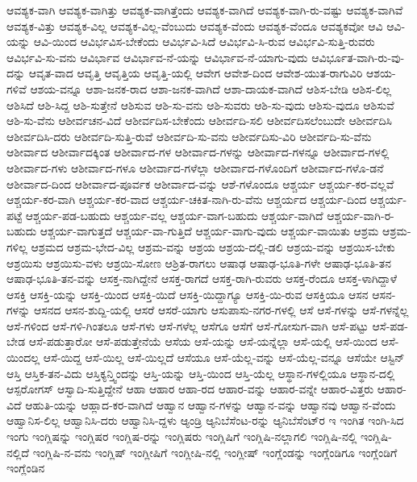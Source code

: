 {ಆವಶ್ಯಕ-ವಾಗಿ
ಆವಶ್ಯಕ-ವಾಗಿತ್ತು
ಆವಶ್ಯಕ-ವಾಗಿತ್ತೆಂದು
ಆವಶ್ಯಕ-ವಾಗಿದೆ
ಆವಶ್ಯಕ-ವಾಗಿ-ರು-ವಷ್ಟು
ಆವಶ್ಯಕ-ವಾಗಿವೆ
ಆವಶ್ಯಕ-ವಿತ್ತು
ಆವಶ್ಯಕ-ವಿಲ್ಲ
ಆವಶ್ಯಕ-ವಿಲ್ಲ-ವೆಂಬುದು
ಆವಶ್ಯಕ-ವೆಂದು
ಆವಶ್ಯಕ-ವೆಂದೂ
ಆವಶ್ಯಕವೋ
ಆವಿ
ಆವಿ-ಯನ್ನು
ಆವಿ-ಯಿಂದ
ಆವಿರ್ಭವಿಸ-ಬೇಕೆಂದು
ಆವಿರ್ಭವಿ-ಸಿದೆ
ಆವಿರ್ಭವಿ-ಸಿ-ರುವ
ಆವಿರ್ಭವಿ-ಸುತ್ತಿ-ರುವರು
ಆವಿರ್ಭವಿ-ಸು-ವನು
ಆವಿರ್ಭಾವ
ಆವಿರ್ಭಾವ-ನೆ-ಯನ್ನು
ಆವಿರ್ಭಾವ-ನೆ-ಯಾಗು-ವುದು
ಆವಿರ್ಭೂತ-ವಾಗಿ-ರು-ವು-ದನ್ನು
ಆವೃತ-ವಾದ
ಆವೃತ್ತಿ
ಆವೃತ್ತಿಯ
ಆವೃತ್ತಿ-ಯಲ್ಲಿ
ಆವೇಗ
ಆವೇಶ-ದಿಂದ
ಆವೇಶ-ಯುತ-ರಾಗುವಿರಿ
ಆಶಯ-ಗಳಿವೆ
ಆಶಯ-ವನ್ನೂ
ಆಶಾ-ಜನಕ-ರಾದ
ಆಶಾ-ಜನಕ-ವಾಗಿದೆ
ಆಶಾ-ದಾಯಕ-ವಾಗಿದೆ
ಆಶಿಸ-ಬೇಡಿ
ಆಶಿಸ-ಲಿಲ್ಲ
ಆಶಿಸಿದೆ
ಆಶಿ-ಸಿದ್ದ
ಆಶಿ-ಸುತ್ತೇನೆ
ಆಶಿಸುವ
ಆಶಿ-ಸು-ವನು
ಆಶಿ-ಸುವರು
ಆಶಿ-ಸು-ವುದು
ಆಶಿಸು-ವುದೂ
ಆಶಿಸುವೆ
ಆಶಿ-ಸು-ವೆನು
ಆಶೀರ್ವಚನ-ವಿದೆ
ಆಶೀರ್ವದಿಸ-ಬೇಕೆಂದು
ಆಶೀರ್ವದಿ-ಸಲಿ
ಆಶೀರ್ವದಿಸಲೆಂಬುದೇ
ಆಶೀರ್ವದಿಸಿ
ಆಶೀರ್ವದಿಸಿ-ದರು
ಆಶೀರ್ವದಿ-ಸುತ್ತಿ-ರುವೆ
ಆಶೀರ್ವದಿ-ಸು-ವನು
ಆಶೀರ್ವದಿಸು-ವಿರಿ
ಆಶೀರ್ವದಿ-ಸು-ವೆನು
ಆಶೀರ್ವಾದ
ಆಶೀರ್ವಾದಕ್ಕಿಂತ
ಆಶೀರ್ವಾದ-ಗಳ
ಆಶೀರ್ವಾದ-ಗಳನ್ನು
ಆಶೀರ್ವಾದ-ಗಳನ್ನೂ
ಆಶೀರ್ವಾದ-ಗಳಲ್ಲಿ
ಆಶೀರ್ವಾದ-ಗಳು
ಆಶೀರ್ವಾದ-ಗಳೂ
ಆಶೀರ್ವಾದ-ಗಳೆಲ್ಲಾ
ಆಶೀರ್ವಾದ-ಗಳೊಂದಿಗೆ
ಆಶೀರ್ವಾದ-ಗಳೊ-ಡನೆ
ಆಶೀರ್ವಾದ-ದಿಂದ
ಆಶೀರ್ವಾದ-ಪೂರ್ವಕ
ಆಶೀರ್ವಾದ-ವನ್ನು
ಆಶೆ-ಗಳೊಂದೂ
ಆಶ್ಚರ್ಯ
ಆಶ್ಚರ್ಯ-ಕರ-ವಲ್ಲವೆ
ಆಶ್ಚರ್ಯ-ಕರ-ವಾಗಿ
ಆಶ್ಚರ್ಯ-ಕರ-ವಾದ
ಆಶ್ಚರ್ಯ-ಚಕಿತ-ನಾಗಿ-ರು-ವೆನು
ಆಶ್ಚರ್ಯದ
ಆಶ್ಚರ್ಯ-ದಿಂದ
ಆಶ್ಚರ್ಯ-ಪಟ್ಟೆ
ಆಶ್ಚರ್ಯ-ಪಡ-ಬಹುದು
ಆಶ್ಚರ್ಯ-ವಲ್ಲ
ಆಶ್ಚರ್ಯ-ವಾಗ-ಬಹುದು
ಆಶ್ಚರ್ಯ-ವಾಗಿದೆ
ಆಶ್ಚರ್ಯ-ವಾಗಿ-ರ-ಬಹುದು
ಆಶ್ಚರ್ಯ-ವಾಗುತ್ತದೆ
ಆಶ್ಚರ್ಯ-ವಾ-ಗುತ್ತಿದೆ
ಆಶ್ಚರ್ಯ-ವಾಗು-ವುದು
ಆಶ್ಚರ್ಯ-ವಾಯಿತು
ಆಶ್ರಮ
ಆಶ್ರಮ-ಗಳಿಲ್ಲ
ಆಶ್ರಮದ
ಆಶ್ರಮ-ಭೇದ-ವಿಲ್ಲ
ಆಶ್ರಮ-ವನ್ನು
ಆಶ್ರಯ
ಆಶ್ರಯ-ದಲ್ಲಿ-ಡಲಿ
ಆಶ್ರಯ-ವನ್ನು
ಆಶ್ರಯಿಸ-ಬೇಕು
ಆಶ್ರಯಿಸು
ಆಶ್ರಯಿಸು-ವಳು
ಆಶ್ರಯಿ-ಸೋಣ
ಆಶ್ರಿತ-ರಾಗಲು
ಆಷಾಢ
ಆಷಾಢ-ಭೂತಿ-ಗಳೇ
ಆಷಾಢ-ಭೂತಿ-ತನ
ಆಷಾಢ-ಭೂತಿ-ತನ-ವನ್ನು
ಆಸಕ್ತ-ನಾಗಿದ್ದೇನೆ
ಆಸಕ್ತ-ರಾಗದೆ
ಆಸಕ್ತ-ರಾಗಿ-ರುವರು
ಆಸಕ್ತ-ರೆಂದೂ
ಆಸಕ್ತ-ಳಾಗಿದ್ದಾಳೆ
ಆಸಕ್ತಿ
ಆಸಕ್ತಿ-ಯನ್ನು
ಆಸಕ್ತಿ-ಯಿಂದ
ಆಸಕ್ತಿ-ಯಿದೆ
ಆಸಕ್ತಿ-ಯಿದ್ದಾಗ್ಯೂ
ಆಸಕ್ತಿ-ಯಿ-ರುವ
ಆಸಕ್ತಿಯೂ
ಆಸನ
ಆಸನ-ಗಳನ್ನು
ಆಸನದ
ಆಸನ-ಶುದ್ದಿ-ಯಲ್ಲಿ
ಆಸರೆ
ಆಸರೆ-ಯಾಗು
ಆಸುಪಾಸು-ನಗರ-ಗಳಲ್ಲಿ
ಆಸೆ
ಆಸೆ-ಗಳನ್ನು
ಆಸೆ-ಗಳನ್ನೆಲ್ಲ
ಆಸೆ-ಗಳಿಂದ
ಆಸೆ-ಗಳಿ-ಗಿಂತಲೂ
ಆಸೆ-ಗಳು
ಆಸೆ-ಗಳೆಲ್ಲ
ಆಸೆಗೂ
ಆಸೆಗೆ
ಆಸೆ-ಗೋಸುಗ-ವಾಗಿ
ಆಸೆ-ಪಟ್ಟು
ಆಸೆ-ಪಡ-ಬೇಡ
ಆಸೆ-ಪಡುತ್ತಾರೋ
ಆಸೆ-ಪಡುತ್ತೇನೆಯೆ
ಆಸೆಯ
ಆಸೆ-ಯನ್ನು
ಆಸೆ-ಯನ್ನೆಲ್ಲಾ
ಆಸೆ-ಯಲ್ಲಿ
ಆಸೆ-ಯಿಂದ
ಆಸೆ-ಯಿಂದಲ್ಲ
ಆಸೆ-ಯಿದ್ದ
ಆಸೆ-ಯಿಲ್ಲ
ಆಸೆ-ಯಿಲ್ಲದೆ
ಆಸೆಯೂ
ಆಸೆ-ಯೆಲ್ಲ-ವನ್ನು
ಆಸೆ-ಯೆಲ್ಲ-ವನ್ನೂ
ಆಸೆಯೇ
ಆಸ್ಟಿನ್
ಆಸ್ತಿ
ಆಸ್ತಿಕ-ತನ-ವಿದು
ಆಸ್ತಿಕ್ಯನ್ತ್ವಿಂದನ್ನು
ಆಸ್ತಿ-ಯನ್ನು
ಆಸ್ತಿ-ಯಿಂದ
ಆಸ್ತಿ-ಯೆಲ್ಲ
ಆಸ್ಥಾನ-ಗಳಲ್ಲಿಯೂ
ಆಸ್ಥಾನ-ದಲ್ಲಿ
ಆಸ್ಪರೋಗಸ್
ಆಸ್ವಾದಿ-ಸುತ್ತಿದ್ದೇನೆ
ಆಹಾ
ಆಹಾರ
ಆಹಾ-ರದ
ಆಹಾರ-ವನ್ನು
ಆಹಾರ-ವನ್ನೇ
ಆಹಾರ-ವಿತ್ತರು
ಆಹಾರ-ವಿದೆ
ಆಹುತಿ-ಯನ್ನು
ಆಹ್ಲಾದ-ಕರ-ವಾಗಿದೆ
ಆಹ್ವಾನ
ಆಹ್ವಾನ-ಗಳನ್ನು
ಆಹ್ವಾನ-ವನ್ನು
ಆಹ್ವಾನವು
ಆಹ್ವಾನ-ವೆಂದು
ಆಹ್ವಾನಿಸ-ಲಿಲ್ಲ
ಆಹ್ವಾನಿಸಿ-ದರು
ಆಹ್ವಾನಿಸಿ-ದ್ದಳು
ಆ್ಯಂಡ್ರಿ
ಆ್ಯನಿಬೆಸೆಂಟ-ರನ್ನು
ಆ್ಯನಿಬೆಸೆಂಟ್‌ರ
ಇ
ಇಂಗಿತ
ಇಂಗಿ-ಸಿದ
ಇಂಗು
ಇಂಗ್ಲಿಷನ್ನು
ಇಂಗ್ಲಿಷರ
ಇಂಗ್ಲಿಷ-ರನ್ನು
ಇಂಗ್ಲಿಷರು
ಇಂಗ್ಲಿಷಿಗೆ
ಇಂಗ್ಲಿಷಿ-ನಲ್ಲಾಗಲಿ
ಇಂಗ್ಲಿಷಿ-ನಲ್ಲಿ
ಇಂಗ್ಲಿಷಿ-ನಲ್ಲಿದೆ
ಇಂಗ್ಲಿಷಿ-ನ-ವನು
ಇಂಗ್ಲಿಷ್
ಇಂಗ್ಲೀಷಿಗೆ
ಇಂಗ್ಲೀಷಿ-ನಲ್ಲಿ
ಇಂಗ್ಲೀಷ್
ಇಂಗ್ಲೆಂಡನ್ನು
ಇಂಗ್ಲೆಂಡಿಗೂ
ಇಂಗ್ಲೆಂಡಿಗೆ
ಇಂಗ್ಲೆಂಡಿನ
}
